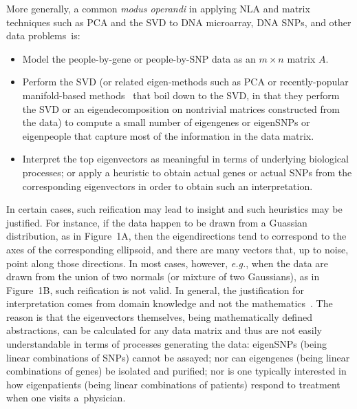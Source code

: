 \documentclass[twoside]{article}
\begin{document}
More generally, a common \emph{modus operandi} in applying NLA and matrix 
techniques such as PCA and the SVD to DNA microarray, DNA SNPs, and other 
data problems~is:
\begin{itemize}
\item
Model the people-by-gene or people-by-SNP data as an $m \times n$ matrix $A$.
\item
Perform the SVD (or related eigen-methods such as PCA or recently-popular 
manifold-based methods~\cite{TSL00,RS00,SWHSL06} that boil down to the SVD, 
in that they perform the SVD or an eigendecomposition on nontrivial matrices 
constructed from the data) 
to compute a small number of eigengenes or eigenSNPs or eigenpeople that 
capture most of the information in the data matrix.
\item 
Interpret the top eigenvectors as meaningful in terms of underlying 
biological processes; or apply a heuristic to obtain actual genes or actual 
SNPs from the corresponding eigenvectors in order to obtain such an 
interpretation.
\end{itemize}
In certain cases, such reification may lead to insight and such heuristics 
may be justified. 
For instance, if the data happen to be drawn from a Guassian distribution, 
as in Figure~1A,
then the eigendirections tend to correspond to the axes of the corresponding
ellipsoid, and there are many vectors that, up to noise, point along those
directions.
In most cases, however, \emph{e.g.}, when the data are drawn from the union 
of two normals (or mixture of two Gaussians), as in Figure~1B, such reification is not valid.
In general, the justification for interpretation comes from domain 
knowledge and not the mathematics~\cite{Gould96,KPS02,MPC78,CUR_PNAS}.
The reason is that the eigenvectors themselves, being mathematically defined
abstractions, can be calculated for any data matrix and thus are not easily 
understandable in terms of processes generating the data:
eigenSNPs (being linear combinations of SNPs) cannot be assayed;
nor can eigengenes (being linear combinations of genes) be isolated and purified;
nor is one typically interested in how eigenpatients (being linear combinations of patients) respond to treatment 
when one visits a~physician.
\end{document}

